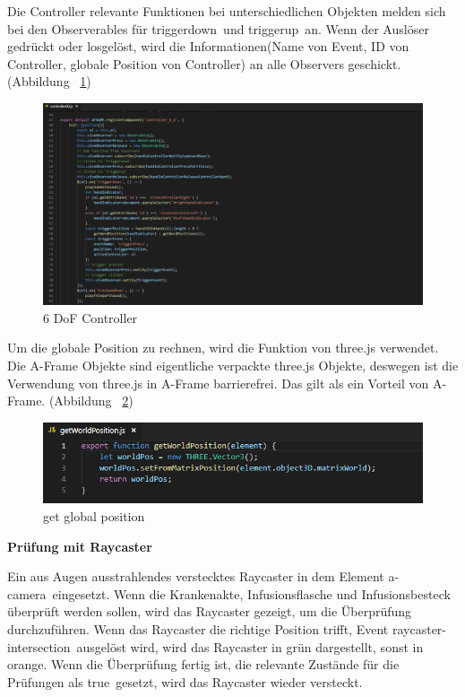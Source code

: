   Die Controller relevante Funktionen bei unterschiedlichen Objekten melden sich bei den Observerables für \glqq triggerdown\grqq\ und \glqq triggerup\grqq\ an. Wenn der Auslöser gedrückt oder losgelöst, wird die Informationen(Name von Event, ID von Controller, globale Position von Controller) an alle Observers geschickt.(Abbildung ~\ref{fig:controller6D})
  
\begin{figure}[ht]
\vspace*{0.3cm}
\centering
\includegraphics[width=\textwidth]{images/controller6D.png}
\caption[6 DoF Controller]{6 DoF Controller}
\label{fig:controller6D} 
\end{figure}
  
  Um die globale Position zu rechnen, wird die Funktion von three.js verwendet. Die A-Frame Objekte sind eigentliche verpackte three.js Objekte, deswegen ist die Verwendung von three.js in A-Frame barrierefrei. Das gilt als ein Vorteil von A-Frame. (Abbildung ~\ref{fig:getWorldPosition})
  
\begin{figure}[ht]
\vspace*{0.3cm}
\centering
\includegraphics[width=\textwidth]{images/getWorldPosition.png}
\caption[get global position]{get global position}
\label{fig:getWorldPosition} 
\end{figure}
  
  \textbf{Prüfung mit Raycaster}
  
  Ein aus Augen ausstrahlendes verstecktes Raycaster in dem Element \glqq a-camera\grqq\ eingesetzt. Wenn die Krankenakte, Infusionsflasche und Infusionsbesteck überprüft werden sollen, wird das Raycaster gezeigt, um die Überprüfung durchzuführen. Wenn das Raycaster die richtige Position trifft, Event \glqq raycaster-intersection\grqq\ ausgelöst wird, wird das Raycaster in grün dargestellt, sonst in orange. Wenn die Überprüfung fertig ist, die relevante Zustände für die Prüfungen als \glqq true\grqq\ gesetzt, wird das Raycaster wieder versteckt.
  
